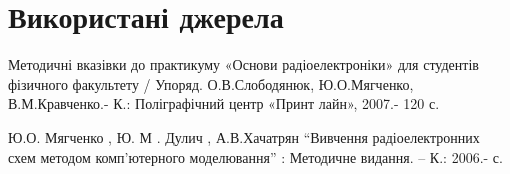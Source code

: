 \section{Використані джерела}

\qquad Методичні вказівки до практикуму «Основи радіоелектроніки»
для студентів фізичного факультету / Упоряд. О.В.Слободянюк,
Ю.О.Мягченко, В.М.Кравченко.- К.: Поліграфічний центр «Принт
лайн», 2007.- 120 с.

\qquad Ю.О. Мягченко , Ю. М . Дулич , А.В.Хачатрян “Вивчення
радіоелектронних схем методом комп’ютерного моделювання” :
Методичне видання. – К.: 2006.- с.
